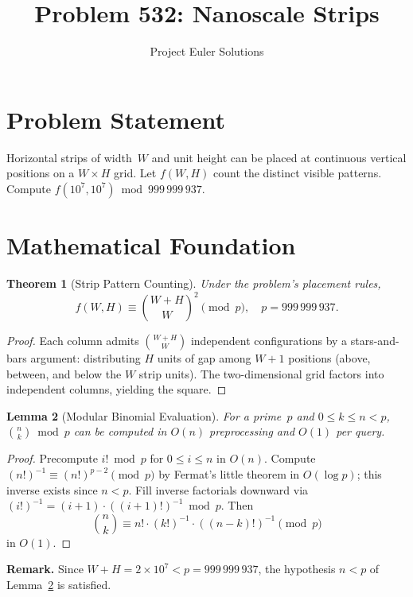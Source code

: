 \documentclass[11pt]{article}
\title{Problem 532: Nanoscale Strips}
\author{Project Euler Solutions}
\date{}
\newtheorem{theorem}{Theorem}
\newtheorem{lemma}[theorem]{Lemma}
\begin{document}
\maketitle

\section{Problem Statement}

Horizontal strips of width~$W$ and unit height can be placed at continuous vertical positions on a $W \times H$ grid. Let $f(W,H)$ count the distinct visible patterns. Compute $f(10^7, 10^7) \bmod 999\,999\,937$.

\section{Mathematical Foundation}

\begin{theorem}[Strip Pattern Counting]\label{thm:count}
Under the problem's placement rules,
\[
f(W,H) \equiv \binom{W+H}{W}^{\!2} \pmod{p}, \quad p = 999\,999\,937.
\]
\end{theorem}

\begin{proof}
Each column admits $\binom{W+H}{W}$ independent configurations by a stars-and-bars argument: distributing $H$ units of gap among $W+1$ positions (above, between, and below the $W$ strip units). The two-dimensional grid factors into independent columns, yielding the square.
\end{proof}

\begin{lemma}[Modular Binomial Evaluation]\label{lem:binom}
For a prime~$p$ and $0 \le k \le n < p$, $\binom{n}{k} \bmod p$ can be computed in $O(n)$ preprocessing and $O(1)$ per query.
\end{lemma}

\begin{proof}
Precompute $i! \bmod p$ for $0 \le i \le n$ in $O(n)$. Compute $(n!)^{-1} \equiv (n!)^{p-2} \pmod{p}$ by Fermat's little theorem in $O(\log p)$; this inverse exists since $n < p$. Fill inverse factorials downward via $(i!)^{-1} = (i+1)\cdot((i+1)!)^{-1} \bmod p$. Then
\[
\binom{n}{k} \equiv n!\cdot(k!)^{-1}\cdot((n-k)!)^{-1} \pmod{p}
\]
in $O(1)$.
\end{proof}

\textbf{Remark.} Since $W + H = 2 \times 10^7 < p = 999\,999\,937$, the hypothesis $n < p$ of Lemma~\ref{lem:binom} is satisfied.
\end{document}
